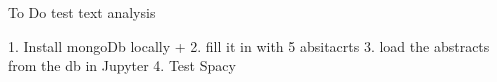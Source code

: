 To Do test text analysis

1. Install mongoDb locally +
2. fill it in with 5 absitacrts 
3. load the abstracts from the db in Jupyter
4. Test Spacy